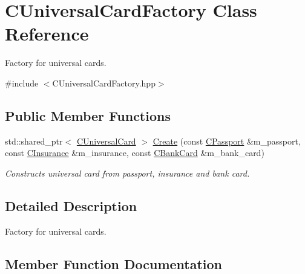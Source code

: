 \hypertarget{classCUniversalCardFactory}{}\section{C\+Universal\+Card\+Factory Class Reference}
\label{classCUniversalCardFactory}


Factory for universal cards.  




{\ttfamily \#include $<$C\+Universal\+Card\+Factory.\+hpp$>$}

\subsection*{Public Member Functions}
\begin{DoxyCompactItemize}
\item 
std\+::shared\+\_\+ptr$<$ \hyperlink{classCUniversalCard}{C\+Universal\+Card} $>$ \hyperlink{classCUniversalCardFactory_a2a9fef0dda5c91cb2d14a4d19554f420}{Create} (const \hyperlink{classCPassport}{C\+Passport} \&m\+\_\+passport, const \hyperlink{classCInsurance}{C\+Insurance} \&m\+\_\+insurance, const \hyperlink{classCBankCard}{C\+Bank\+Card} \&m\+\_\+bank\+\_\+card)
\begin{DoxyCompactList}\small\item\em Constructs universal card from passport, insurance and bank card. \end{DoxyCompactList}\end{DoxyCompactItemize}


\subsection{Detailed Description}
Factory for universal cards. 

\subsection{Member Function Documentation}
